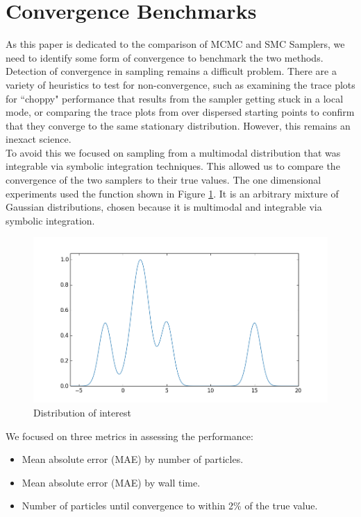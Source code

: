 \documentclass[12pt]{elsarticle}
\begin{document}
\section*{Convergence Benchmarks}
As this paper is dedicated to the comparison of MCMC and SMC Samplers, we need to identify some form of convergence to benchmark the two methods. Detection of convergence in sampling remains a difficult problem.  There are a variety of heuristics to test for non-convergence, such as examining the trace plots for ``choppy" performance that results from the sampler getting stuck in a local mode, or comparing the trace plots from over dispersed starting points to confirm that they converge to the same stationary distribution. However, this remains an inexact science.\\

To avoid this we focused on sampling from a multimodal distribution that was integrable via symbolic integration techniques. This allowed us to compare the convergence of the two samplers to their true values. The one dimensional experiments used the function shown in Figure \ref{function}. It is an arbitrary mixture of Gaussian distributions, chosen because it is multimodal and integrable via symbolic integration. \\

\begin{figure}[htbp]
\begin{center}
\includegraphics[width = \textwidth]{plots/function.png}
\caption{Distribution of interest}
\label{function}
\end{center}
\end{figure}

\noindent
We focused on three metrics in assessing the performance:
\begin{itemize}
\item Mean absolute error (MAE) by number of particles. 
\item Mean absolute error (MAE) by wall time. 
\item Number of particles until convergence to within 2\% of the true value. 
\end{itemize}
\end{document}
